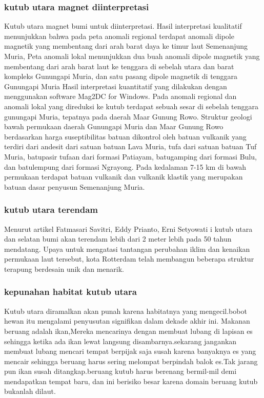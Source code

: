 \subsubsection{kutub utara magnet diinterpretasi}
		Kutub utara magnet bumi untuk diinterpretasi. Hasil interpretasi kualitatif menunjukkan bahwa pada peta anomali regional terdapat anomali dipole 
	magnetik yang membentang dari arah barat daya ke timur laut Semenanjung Muria, Peta anomali lokal menunjukkan dua buah anomali dipole magnetik yang 
	membentang dari arah barat laut ke tenggara di sebelah utara dan barat kompleks Gunungapi Muria, dan satu pasang dipole magnetik di tenggara Gunungapi
	Muria Hasil interpretasi kuantitatif yang dilakukan dengan menggunakan software Mag2DC for Windows. Pada anomali regional dan anomali lokal yang direduksi
	ke kutub terdapat sebuah sesar di sebelah tenggara gunungapi Muria, tepatnya pada daerah Maar Gunung Rowo. Struktur geologi bawah permukaan daerah 
	Gunungapi Muria dan Maar Gunung Rowo berdasarkan harga suseptibilitas batuan dikontrol oleh batuan vulkanik yang terdiri dari andesit dari 
	satuan batuan Lava Muria, tufa dari satuan batuan Tuf Muria, batupasir tufaan dari formasi Patiayam, batugamping dari formasi Bulu, dan 
	batulempung dari formasi Ngrayong. Pada kedalaman 7-15 km di bawah permukaan terdapat batuan vulkanik dan vulkanik klastik yang merupakan 
	batuan dasar penyusun Semenanjung Muria.
	
\subsubsection {kutub utara terendam}
		Menurut artikel Fatmasari Savitri, Eddy Prianto, Erni Setyowati i kutub utara dan selatan bumi akan terendam lebih dari 2 meter lebih pada 50 
	tahun mendatang. Upaya untuk mengatasi tantangan perubahan iklim dan kenaikan permukaan laut tersebut, kota Rotterdam telah membangun beberapa 
	struktur terapung berdesain unik dan menarik. 
	
\subsubsection {kepunahan habitat kutub utara}
		Kutub utara diramalkan akan punah karena habitatnya yang mengecil.bobot hewan itu mengalami penyusutan signifikan dalam dekade akhir ini.
	Makanan beruang adalah ikan,Mereka mencarinya dengan membuat lubang di lapisan es sehingga ketika ada ikan lewat langsung disambarnya.sekarang 
	jangankan membuat lubang mencari tempat berpijak saja susah karena banyaknya es yang mencair sehingga beruang harus sering melompat berpindah 
	balok es.Tak jarang pun ikan susah ditangkap.beruang kutub harus berenang bermil-mil demi mendapatkan tempat baru, dan ini berisiko besar karena 
	domain beruang kutub bukanlah dilaut.
	
		


